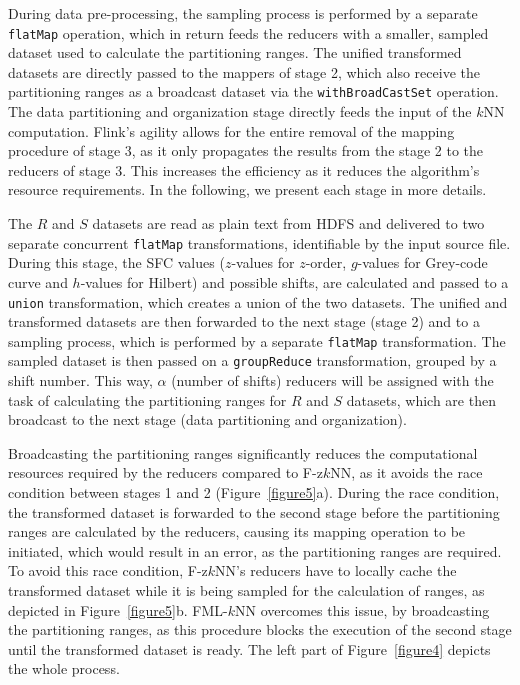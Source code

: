 During data pre-processing, the sampling process is performed by a separate \texttt{flatMap} operation, which in return feeds the reducers with a smaller, sampled dataset used to calculate the partitioning ranges. The unified transformed datasets are directly passed to the mappers of stage 2, which also receive the partitioning ranges as a broadcast dataset via the \texttt{withBroadCastSet} operation. The data partitioning and organization stage directly feeds the input of the $k$NN computation. Flink's agility allows for the entire removal of the mapping procedure of stage 3, as it only propagates the results from the stage 2 to the reducers of stage 3. This increases the efficiency as it reduces the algorithm's resource requirements. In the following, we present each stage in more details.

\label{par:algorithmic1}
The $R$ and $S$ datasets are read as plain text from HDFS and delivered to two separate concurrent \texttt{flatMap} transformations, identifiable by the input source file. During this stage, the SFC values ($z$-values for $z$-order, $g$-values for Grey-code curve and $h$-values for Hilbert) and possible shifts, are calculated and passed to a \texttt{union} transformation, which creates a union of the two datasets. The unified and transformed datasets are then forwarded to the next stage (stage 2) and to a sampling process, which is performed by a separate \texttt{flatMap} transformation. The sampled dataset is then passed on a \texttt{groupReduce} transformation, grouped by a shift number. This way, $\alpha$ (number of shifts) reducers will be assigned with the task of calculating the partitioning ranges for $R$ and $S$ datasets, which are then broadcast to the next stage (data partitioning and organization). 

Broadcasting the partitioning ranges significantly reduces the computational resources required by the reducers compared to F-z$k$NN, as it avoids the race condition between stages 1 and 2 (Figure~\ref{figure5}a). During the race condition, the transformed dataset is forwarded to the second stage before the partitioning ranges are calculated by the reducers, causing its mapping operation to be initiated, which would result in an error, as the partitioning ranges are required. To avoid this race condition, F-z$k$NN's reducers have to locally cache the transformed dataset while it is being sampled for the calculation of ranges, as depicted in Figure~\ref{figure5}b. FML-$k$NN overcomes this issue, by broadcasting the partitioning ranges, as this procedure blocks the execution of the second stage until the transformed dataset is ready. The left part of Figure~\ref{figure4} depicts the whole process.

